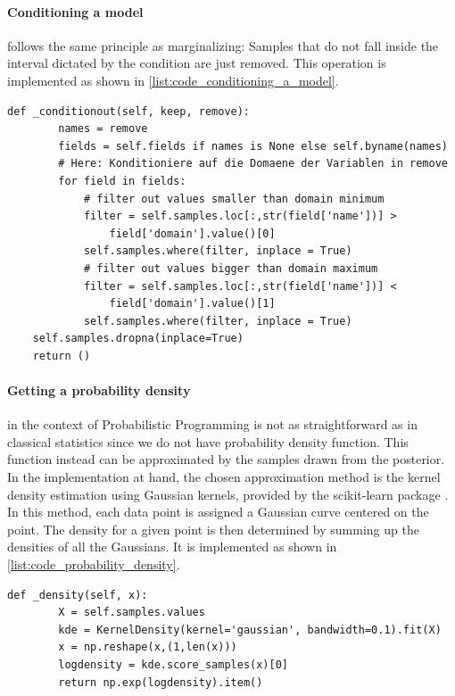 \documentclass{article}
\begin{document}
\paragraph{Conditioning a model} follows the same principle as marginalizing: Samples that do not fall inside the interval dictated by the condition are just removed. This operation is implemented as shown in \autoref{list:code_conditioning_a_model}.
\begin{lstlisting}[caption={Implementation of conditioning a model}, label={list:code_conditioning_a_model},captionpos=b]
    def _conditionout(self, keep, remove):
        names = remove
        fields = self.fields if names is None else self.byname(names)
        # Here: Konditioniere auf die Domaene der Variablen in remove
        for field in fields:
            # filter out values smaller than domain minimum
            filter = self.samples.loc[:,str(field['name'])] > 
                field['domain'].value()[0]
            self.samples.where(filter, inplace = True)
            # filter out values bigger than domain maximum
            filter = self.samples.loc[:,str(field['name'])] < 
                field['domain'].value()[1]
            self.samples.where(filter, inplace = True)
    self.samples.dropna(inplace=True)
    return ()
\end{lstlisting}
\paragraph{Getting a probability density} in the context of Probabilistic Programming is not as straightforward as in classical statistics since we do not have probability density function. This function instead can be approximated by the samples drawn from the posterior. In the implementation at hand, the chosen approximation method is the kernel density estimation using Gaussian kernels, provided by the scikit-learn package \cite{scikit-learn}. In this method, each data point is assigned a Gaussian curve centered on the point. The density for a given point is then determined by summing up the densities of all the Gaussians. It is implemented as shown in \autoref{list:code_probability_density}.
\begin{lstlisting}[caption={Implementation of computing the probability density for a given point}, label={list:code_probability_density},captionpos=b]
    def _density(self, x):
        X = self.samples.values
        kde = KernelDensity(kernel='gaussian', bandwidth=0.1).fit(X)
        x = np.reshape(x,(1,len(x)))
        logdensity = kde.score_samples(x)[0]
        return np.exp(logdensity).item()
\end{lstlisting}
\end{document}
